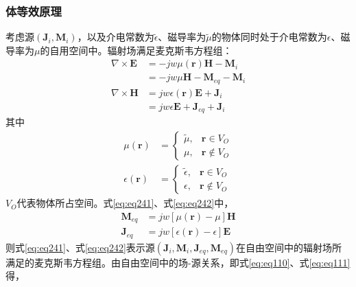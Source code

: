 \documentclass{article}
\numberwithin{equation}{section}
\renewcommand{\vec}[1]{\boldsymbol{#1}}
\begin{document}
\subsubsection{体等效原理}
考虑源$(\mathbf{J}_i,\mathbf{M}_i)$，以及介电常数为$\tilde{\epsilon}$、磁导率为$\tilde{\mu}$的物体同时处于介电常数为$\epsilon$、磁导率为$\mu$的自用空间中。辐射场满足麦克斯韦方程组：
\begin{align}
    \label{eq:eq241}
    \nabla\times\mathbf{E}&=-jw\mu(\vec{r})\mathbf{H}-\mathbf{M}_i \nonumber \\
                          &=-jw\mu\mathbf{H}-\mathbf{M}_{eq}-\mathbf{M}_i \\
    \label{eq:eq242}
    \nabla\times\mathbf{H}&=jw\epsilon(\vec{r})\mathbf{E}+\mathbf{J}_i \nonumber \\
                          &=jw\epsilon\mathbf{E}+\mathbf{J}_{eq}+\mathbf{J}_i
\end{align}
其中
\begin{align}
    \label{eq:eq243}
    \mu(\vec{r})&=
    \left\{
        \begin{array}{lr}
            \tilde{\mu}, &\vec{r}\in V_O \\
            \mu,         &\vec{r}\notin V_O
        \end{array}
    \right. \\
    \label{eq:eq244}
    \epsilon(\vec{r})&=
    \left\{
        \begin{array}{lr}
            \tilde{\epsilon}, &\vec{r}\in V_O \\
            \epsilon,         &\vec{r}\notin V_O
        \end{array}
    \right.
\end{align}
$V_O$代表物体所占空间。式\ref{eq:eq241}、式\ref{eq:eq242}中，
\begin{align}
    \label{eq:eq245}
    \mathbf{M}_{eq}&=jw[\mu(\vec{r})-\mu]\mathbf{H} \\
    \label{eq:eq246}
    \mathbf{J}_{eq}&=jw[\epsilon(\vec{r})-\epsilon]\mathbf{E}
\end{align}
则式\ref{eq:eq241}、式\ref{eq:eq242}表示源$(\mathbf{J}_i,\mathbf{M}_i,\mathbf{J}_{eq},\mathbf{M}_{eq})$在自由空间中的辐射场所满足的麦克斯韦方程组。由自由空间中的场-源关系，即式\ref{eq:eq110}、式\ref{eq:eq111}得，
\end{document}
